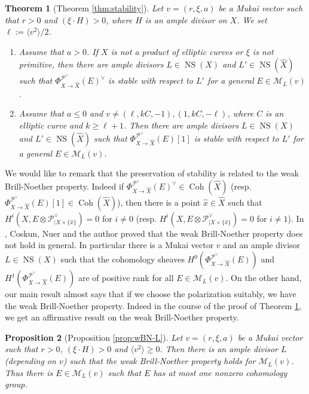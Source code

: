 \documentclass[10pt]{amsart}
\def\cal{\mathcal}
\newcommand{\Coh}{\operatorname{Coh}}
\newcommand{\NS}{\operatorname{NS}}
\numberwithin{equation}{section}
\theoremstyle{plain}
\newtheorem{thm}{Theorem}[section]
\newtheorem{prop}[thm]{Proposition}
\theoremstyle{definition}
\theoremstyle{remark}
\begin{document}
\begin{thm}[{Theorem \ref{thm:stability}}]\label{thm:main}
Let $v=(r,\xi,a)$ be a Mukai vector such that $r > 0$ and $(\xi \cdot H)>0$, where 
$H$ is an ample divisor on $X$.
We set $\ell:=\langle v^2 \rangle/2$.
\begin{enumerate}
\item[(1)]
Assume that $a>0$. 
If $X$ is not a product of elliptic curves or $\xi$ is not primitive,
then there are ample divisors $L \in \NS(X)$ and $L' \in \NS(\widehat{X})$ such that 
$\Phi_{X \to \widehat{X}}^{{\cal P}^{\vee}}(E)^{\vee}$ is stable with respect to $L'$ for a general
$E \in {\cal M}_L(v)$.
\item[(2)]
Assume that $a \leq 0$ and
$v \ne (\ell,kC,-1), (1,kC,-\ell)$, where 
$C$ is an elliptic curve and $k \geq \ell+1$. 
Then there are ample divisors $L \in \NS(X)$ and $L' \in \NS(\widehat{X})$ such that 
$\Phi_{X \to \widehat{X}}^{{\cal P}^{\vee}}(E)[1]$ is stable with respect to $L'$ for a general
$E \in {\cal M}_L(v)$.
\end{enumerate}
\end{thm}

We would like to remark that the preservation of stability is related to the weak Brill-Noether property.
Indeed if $\Phi_{X \to \widehat{X}}^{{\cal P}^{\vee}}(E)^{\vee} \in \Coh(\widehat{X})$ (resp.
$\Phi_{X \to \widehat{X}}^{{\cal P}^{\vee}}(E)[1] \in \Coh(\widehat{X})$), then
there is a point $\hat{x} \in \widehat{X}$ such that
$H^i(X,E \otimes {\cal P}_{|X \times \{\hat{x} \}}^{\vee})=0$ for $i \ne 0$
(resp. $H^i(X,E \otimes {\cal P}_{|X \times \{\hat{x} \}}^{\vee})=0$ for $i \ne 1$).
In \cite{CNY2}, Coskun, Nuer and the author proved 
that the weak Brill-Noether property 
does not hold in general.
In particular there is a Mukai vector $v$ and an ample divisor $L \in \NS(X)$
such that the cohomology sheaves $H^0(\Phi_{X \to \widehat{X}}^{{\cal P}^{\vee}}(E))$ and
$H^1(\Phi_{X \to \widehat{X}}^{{\cal P}^{\vee}}(E))$ are of positive rank  
for all $E \in {\cal M}_L(v)$.
On the other hand, our main result almost says that if we choose the polarization suitably,
we have the weak Brill-Noether property.
Indeed in the course of the proof of Theorem \ref{thm:main},
we get an affirmative result on the weak Brill-Noether property.
\begin{prop}[{Proposition \ref{prop:wBN-L}}]\label{prop:main}
Let $v=(r,\xi,a)$ be a Mukai vector such that $r>0$, $(\xi \cdot H)>0$ and $\langle v^2 \rangle \geq 0$.
Then there is an ample divisor $L$ (depending on $v$) such that the weak Brill-Noether property holds for
${\cal M}_L(v)$.  
Thus there is $E \in {\cal M}_L(v)$ such that $E$ has at most one nonzero cohomology group.
\end{prop}
\end{document}
